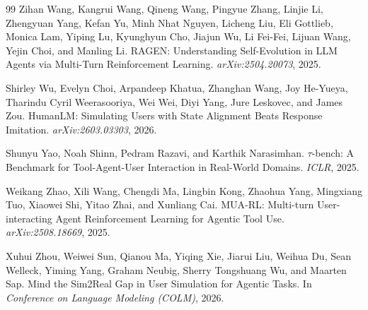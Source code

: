 \documentclass{article}
\begin{document}
{\begin{thebibliography}{99}
Zihan Wang, Kangrui Wang, Qineng Wang, Pingyue Zhang, Linjie Li, Zhengyuan Yang, Kefan Yu, Minh Nhat Nguyen, Licheng Liu, Eli Gottlieb, Monica Lam, Yiping Lu, Kyunghyun Cho, Jiajun Wu, Li Fei-Fei, Lijuan Wang, Yejin Choi, and Manling Li.
\newblock RAGEN: Understanding Self-Evolution in LLM Agents via Multi-Turn Reinforcement Learning.
\newblock \emph{arXiv:2504.20073}, 2025.

Shirley Wu, Evelyn Choi, Arpandeep Khatua, Zhanghan Wang, Joy He-Yueya, Tharindu Cyril Weerasooriya, Wei Wei, Diyi Yang, Jure Leskovec, and James Zou.
\newblock HumanLM: Simulating Users with State Alignment Beats Response Imitation.
\newblock \emph{arXiv:2603.03303}, 2026.

Shunyu Yao, Noah Shinn, Pedram Razavi, and Karthik Narasimhan.
\newblock $\tau$-bench: A Benchmark for Tool-Agent-User Interaction in Real-World Domains.
\newblock \emph{ICLR}, 2025.

Weikang Zhao, Xili Wang, Chengdi Ma, Lingbin Kong, Zhaohua Yang, Mingxiang Tuo, Xiaowei Shi, Yitao Zhai, and Xunliang Cai.
\newblock MUA-RL: Multi-turn User-interacting Agent Reinforcement Learning for Agentic Tool Use.
\newblock \emph{arXiv:2508.18669}, 2025.

Xuhui Zhou, Weiwei Sun, Qianou Ma, Yiqing Xie, Jiarui Liu, Weihua Du, Sean Welleck, Yiming Yang, Graham Neubig, Sherry Tongshuang Wu, and Maarten Sap.
\newblock Mind the Sim2Real Gap in User Simulation for Agentic Tasks.
\newblock In \emph{Conference on Language Modeling (COLM)}, 2026.

\end{thebibliography}
}
\appendix
\end{document}
